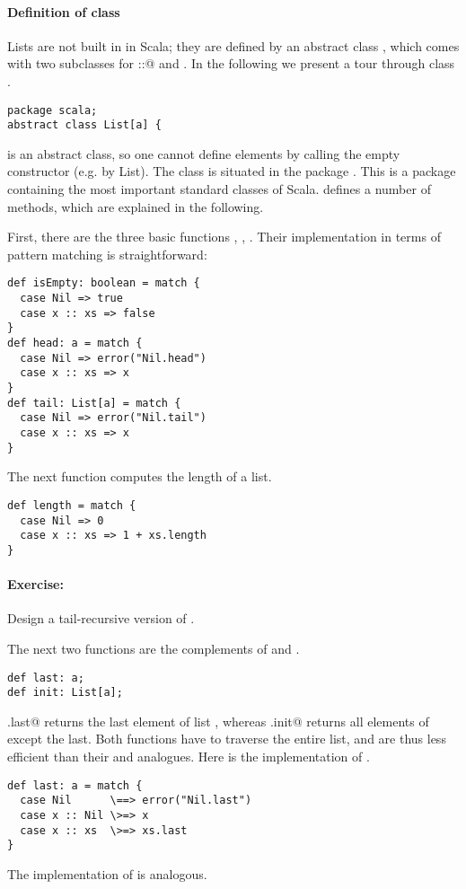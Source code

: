 \documentclass[11pt]{book}
\newcommand{\exercise}{\paragraph{Exercise:}}
\begin{document}
\paragraph{Definition of class \verb@List@}

Lists are not built in in Scala; they are defined by an abstract class
\verb@List@, which comes with two subclasses for \verb@::@ and \verb@Nil@.
In the following we present a tour through class \verb@List@.
\begin{verbatim}
package scala;
abstract class List[a] {
\end{verbatim}
\verb@List@ is an abstract class, so one cannot define elements by
calling the empty \verb@List@ constructor (e.g. by \verb@new List).
The class is situated in the package \verb@scala@. This is a package
containing the most important standard classes of Scala. \verb@List@
defines a number of methods, which are explained in the following.

First, there are the three basic functions \verb@isEmpty@, 
\verb@head@, \verb@tail@. Their implementation in terms of pattern
matching is straightforward:
\begin{verbatim}
def isEmpty: boolean = match {
  case Nil => true
  case x :: xs => false 
}   
def head: a = match { 
  case Nil => error("Nil.head") 
  case x :: xs => x 
}
def tail: List[a] = match { 
  case Nil => error("Nil.tail") 
  case x :: xs => x 
}
\end{verbatim}

The next function computes the length of a list.
\begin{verbatim}
def length = match {
  case Nil => 0
  case x :: xs => 1 + xs.length
}
\end{verbatim}

\exercise Design a tail-recursive version of \verb@length@.

The next two functions are the complements of \verb@head@ and
\verb@tail@.
\begin{verbatim}
def last: a;
def init: List[a];
\end{verbatim}
\verb@xs.last@ returns the last element of list \verb@xs@, whereas
\verb@xs.init@ returns all elements of \verb@xs@ except the last.
Both functions have to traverse the entire list, and are thus less
efficient than their \verb@head@ and \verb@tail@ analogues.
Here is the implementation of \verb@last@.
\begin{verbatim}
def last: a = match {
  case Nil      \==> error("Nil.last")
  case x :: Nil \>=> x
  case x :: xs  \>=> xs.last
}
\end{verbatim}
The implementation of \verb@init@ is analogous.
\end{document}
